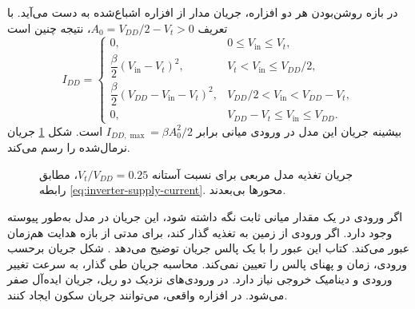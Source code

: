 در بازه روشن‌بودن هر دو افزاره، جریان مدار از افزاره اشباع‌شده
به دست می‌آید. با تعریف \(A_0=V_{DD}/2-V_t>0\)، نتیجه چنین است
\begin{equation}
 I_{DD}=
 \begin{cases}
 0,&0\le V_{\mathrm{in}}\le V_t,\\[2pt]
 \dfrac{\beta}{2}(V_{\mathrm{in}}-V_t)^2,
     &V_t<V_{\mathrm{in}}\le V_{DD}/2,\\[4pt]
 \dfrac{\beta}{2}(V_{DD}-V_{\mathrm{in}}-V_t)^2,
     &V_{DD}/2<V_{\mathrm{in}}<V_{DD}-V_t,\\[4pt]
 0,&V_{DD}-V_t\le V_{\mathrm{in}}\le V_{DD}.
 \end{cases}
 \label{eq:inverter-supply-current}
\end{equation}
بیشینه جریان این مدل در ورودی میانی برابر
\(I_{DD,\max}=\beta A_0^2/2\) است. شکل
\ref{fig:inverter-supply-current} جریان نرمال‌شده را رسم می‌کند.
\begin{figure}[!htbp]
\centering
\begin{latin}
\PersianMathDigits
{}
\end{latin}
\caption{جریان تغذیه مدل مربعی برای نسبت آستانه
\(V_t/V_{DD}=0.25\)، مطابق رابطه \eqref{eq:inverter-supply-current}.
محورها بی‌بعدند.}
\label{fig:inverter-supply-current}
\end{figure}

اگر ورودی در یک مقدار میانی ثابت نگه داشته شود، این جریان در
مدل  به‌طور پیوسته وجود دارد. اگر ورودی از زمین به تغذیه
گذار کند، برای مدتی از بازه هدایت هم‌زمان عبور می‌کند. کتاب این
عبور را با یک پالس جریان توضیح می‌دهد
\cite[شکل  و صفحه ۸۸]{weste}.
شکل جریان برحسب ورودی، زمان و پهنای پالس را تعیین نمی‌کند.
محاسبه جریان طی گذار، به سرعت تغییر ورودی و دینامیک خروجی نیاز دارد.
در ورودی‌های نزدیک دو ریل، جریان ایده‌آل صفر می‌شود. در افزاره
واقعی،  می‌توانند جریان سکون ایجاد کنند.

